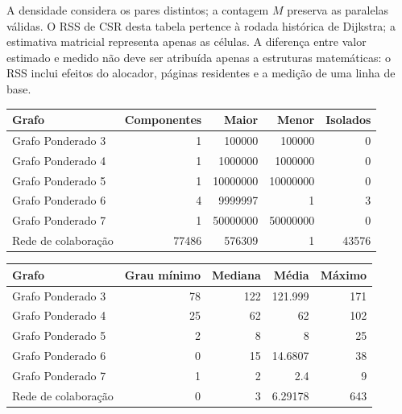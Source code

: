 \documentclass[a4paper,12pt]{article}
\begin{document}
A densidade considera os pares distintos; a contagem $M$ preserva as paralelas válidas. O RSS de CSR desta tabela pertence à rodada histórica de Dijkstra; a estimativa matricial representa apenas as células. A diferença entre valor estimado e medido não deve ser atribuída apenas a estruturas matemáticas: o RSS inclui efeitos do alocador, páginas residentes e a medição de uma linha de base.
\par\smallskip\noindent\begin{minipage}{\textwidth}\centering
\begingroup\fontsize{9}{11}\selectfont
\setlength{\tabcolsep}{4pt}
\begin{tabular}{lrrrr}
\toprule
Grafo & Componentes & Maior & Menor & Isolados \\
\midrule
Grafo Ponderado 3 & \num{1} & \num{100000} & \num{100000} & \num{0} \\
Grafo Ponderado 4 & \num{1} & \num{1000000} & \num{1000000} & \num{0} \\
Grafo Ponderado 5 & \num{1} & \num{10000000} & \num{10000000} & \num{0} \\
Grafo Ponderado 6 & \num{4} & \num{9999997} & \num{1} & \num{3} \\
Grafo Ponderado 7 & \num{1} & \num{50000000} & \num{50000000} & \num{0} \\
Rede de colaboração & \num{77486} & \num{576309} & \num{1} & \num{43576} \\
\bottomrule
\end{tabular}
\endgroup
{}
\end{minipage}\par\smallskip
\par\smallskip\noindent\begin{minipage}{\textwidth}\centering
\begingroup\fontsize{9}{11}\selectfont
\setlength{\tabcolsep}{4pt}
\begin{tabular}{lrrrr}
\toprule
Grafo & Grau mínimo & Mediana & Média & Máximo \\
\midrule
Grafo Ponderado 3 & \num{78} & \num{122} & \num{121.999} & \num{171} \\
Grafo Ponderado 4 & \num{25} & \num{62} & \num{62} & \num{102} \\
Grafo Ponderado 5 & \num{2} & \num{8} & \num{8} & \num{25} \\
Grafo Ponderado 6 & \num{0} & \num{15} & \num{14.6807} & \num{38} \\
Grafo Ponderado 7 & \num{1} & \num{2} & \num{2.4} & \num{9} \\
Rede de colaboração & \num{0} & \num{3} & \num{6.29178} & \num{643} \\
\bottomrule
\end{tabular}
\endgroup
{}
\end{minipage}\par\smallskip
\end{document}
